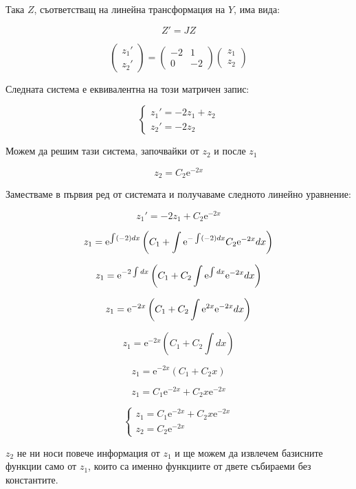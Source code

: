 \documentclass{scrartcl}
\begin{document}
Така $Z$, съответстващ на линейна трансформация на $Y$, има вида:

$$Z' = JZ$$

$$
\begin{pmatrix}
    z_1'\\z_2'
\end{pmatrix}
=
\begin{pmatrix}
    -2 & 1\\
    0 & -2
\end{pmatrix}
\begin{pmatrix}
    z_1\\
    z_2
\end{pmatrix}
$$

Следната система е еквивалентна на този матричен запис:

$$
\begin{cases}
    z_1' = -2z_1 + z_2\\
    z_2' = -2z_2
\end{cases}
$$

Можем да решим тази система, започвайки от $z_2$ и после $z_1$

$$z_2 = C_2\mathrm{e}^{-2x}$$

Заместваме в първия ред от системата и получаваме следното линейно уравнение:

$$z_1' = -2z_1 + C_2\mathrm{e}^{-2x}$$

$$z_1 = \mathrm{e}^{\int (-2) \space dx}\left(C_1 + \int \mathrm{e}^{-\int (-2) \space dx}C_2\mathrm{e}^{-2x} \space dx \right)$$

$$z_1 = \mathrm{e}^{-2 \int dx}\left(C_1 + C_2\int \mathrm{e}^{\int dx}\mathrm{e}^{-2x} \space dx \right)$$

$$z_1 = \mathrm{e}^{-2x}\left(C_1 + C_2\int \mathrm{e}^{2x}\mathrm{e}^{-2x} \space dx \right)$$

$$z_1 = \mathrm{e}^{-2x}\left(C_1 + C_2\int dx \right)$$

$$z_1 = \mathrm{e}^{-2x}\left(C_1 + C_2x \right)$$

$$z_1 = C_1\mathrm{e}^{-2x} + C_2x\mathrm{e}^{-2x}$$

$$
\begin{cases}
    z_1 = C_1\mathrm{e}^{-2x} + C_2x\mathrm{e}^{-2x}\\
    z_2 = C_2\mathrm{e}^{-2x}
\end{cases}
$$

$z_2$ не ни носи повече информация от $z_1$ и ще можем да извлечем базисните функции само от $z_1$, които са именно функциите от двете събираеми без константите.
\end{document}
